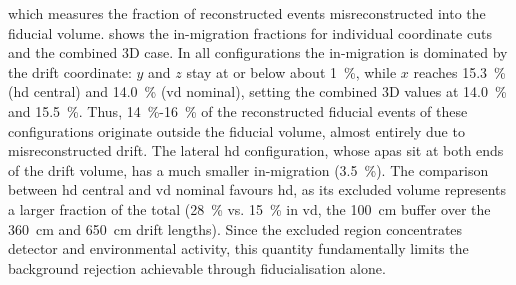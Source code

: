 \noindent which measures the fraction of reconstructed events misreconstructed into the fiducial volume.  shows the in-migration fractions for individual coordinate cuts and the combined 3D case. In all configurations the in-migration is dominated by the drift coordinate: $y$ and $z$ stay at or below about \SI{1}{\percent}, while $x$ reaches \SI{15.3}{\percent} (\gls{hd} central) and \SI{14.0}{\percent} (\gls{vd} nominal), setting the combined 3D values at \SI{14.0}{\percent} and \SI{15.5}{\percent}. Thus, \SI{14}{\percent}-\SI{16}{\percent} of the reconstructed fiducial events of these configurations originate outside the fiducial volume, almost entirely due to misreconstructed drift. The lateral \gls{hd} configuration, whose \glspl{apa} sit at both ends of the drift volume, has a much smaller in-migration (\SI{3.5}{\percent}). The comparison between \gls{hd} central and \gls{vd} nominal favours \gls{hd}, as its excluded volume represents a larger fraction of the total (\SI{28}{\percent} vs. \SI{15}{\percent} in \gls{vd}, the \SI{100}{\centi\meter} buffer over the \SI{360}{\centi\meter} and \SI{650}{\centi\meter} drift lengths). Since the excluded region concentrates detector and environmental activity, this quantity fundamentally limits the background rejection achievable through fiducialisation alone.

\begin{table}[ht!]
    
    \caption[width=1\linewidth]{Fraction of the reconstructed fiducial sample whose true vertex lies outside the fiducial volume, for a \SI{100}{\centi\meter}-cut fiducial volume and \SI{10}{\mega\electronvolt} neutrinos.\label{tab:FIDUCIALIZATION_INMIGRATION_10MEV}}
\end{table}
